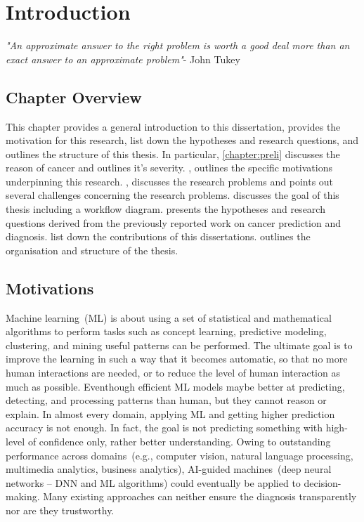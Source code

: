 \chapter{Introduction}
\label{chapter:introduction}
\textit{"An approximate answer to the right problem is worth a good deal more than an exact answer to an approximate problem"}- John Tukey

\section{Chapter Overview}
This chapter provides a general introduction to this dissertation, provides the motivation for this research, list down the hypotheses and research questions, and outlines the structure of this thesis. In particular, \cref{chapter:preli} discusses the reason of cancer and outlines it's severity. , outlines the specific motivations underpinning this research. , discusses the research problems and points out several challenges concerning the research problems.  discusses the goal of this thesis including a workflow diagram.  presents the hypotheses and research questions derived from the previously reported work on cancer prediction and diagnosis.  list down the contributions of this dissertations.  outlines the organisation and structure of the thesis.

\section{Motivations}\label{motivations}
Machine learning~(ML) is about using a set of statistical and mathematical algorithms to perform tasks such as concept learning, predictive modeling, clustering, and mining useful patterns can be performed. The ultimate goal is to improve the learning in such a way that it becomes automatic, so that no more human interactions are needed, or to reduce the level of human interaction as much as possible. Eventhough efficient ML models maybe better at predicting, detecting, and processing patterns than human, but they cannot reason or explain. In almost every domain, applying ML and getting higher prediction accuracy is not enough. In fact, the goal is not predicting something with high-level of confidence only, rather better understanding. Owing to outstanding performance across domains~(e.g., computer vision, natural language processing, multimedia analytics, business analytics), AI-guided machines~(deep neural networks -- DNN and ML algorithms) could eventually be applied to decision-making. Many existing approaches can neither ensure the diagnosis transparently nor are they trustworthy. 

